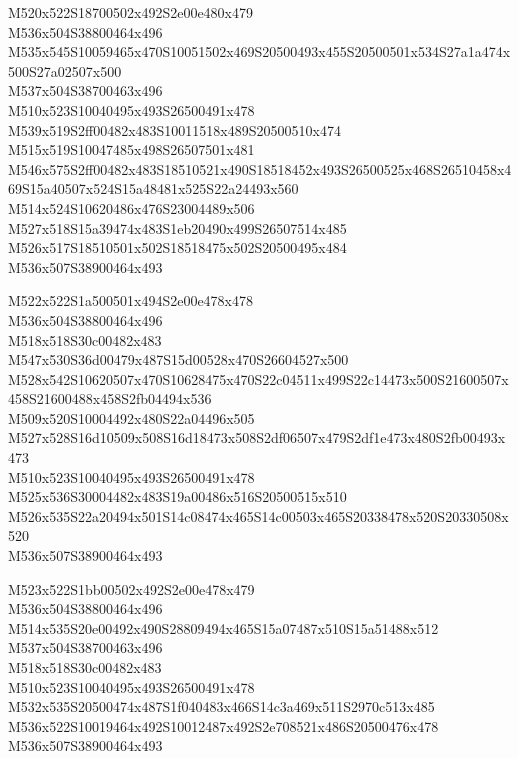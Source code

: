 \documentclass{article}
\begin{document}
\begin{multicols}{5}
\begin{center}

M520x522S18700502x492S2e00e480x479 %
\\M536x504S38800464x496 %
\\M535x545S10059465x470S10051502x469S20500493x455S20500501x534S27a1a474x500S27a02507x500 %
\\M537x504S38700463x496 %
\\M510x523S10040495x493S26500491x478 %
\\M539x519S2ff00482x483S10011518x489S20500510x474 %
\\M515x519S10047485x498S26507501x481 %
\\M546x575S2ff00482x483S18510521x490S18518452x493S26500525x468S26510458x469S15a40507x524S15a48481x525S22a24493x560 %
\\M514x524S10620486x476S23004489x506 %
\\M527x518S15a39474x483S1eb20490x499S26507514x485 %
\\M526x517S18510501x502S18518475x502S20500495x484 %
\\M536x507S38900464x493 %
\vfil
\columnbreak

M522x522S1a500501x494S2e00e478x478 %
\\M536x504S38800464x496 %
\\M518x518S30c00482x483 %
\\M547x530S36d00479x487S15d00528x470S26604527x500 %
\\M528x542S10620507x470S10628475x470S22c04511x499S22c14473x500S21600507x458S21600488x458S2fb04494x536 %
\\M509x520S10004492x480S22a04496x505 %
\\M527x528S16d10509x508S16d18473x508S2df06507x479S2df1e473x480S2fb00493x473 %
\\M510x523S10040495x493S26500491x478 %
\\M525x536S30004482x483S19a00486x516S20500515x510 %
\\M526x535S22a20494x501S14c08474x465S14c00503x465S20338478x520S20330508x520 %
\\M536x507S38900464x493 %
\vfil
\columnbreak

M523x522S1bb00502x492S2e00e478x479 %
\\M536x504S38800464x496 %
\\M514x535S20e00492x490S28809494x465S15a07487x510S15a51488x512 %
\\M537x504S38700463x496 %
\\M518x518S30c00482x483 %
\\M510x523S10040495x493S26500491x478 %
\\M532x535S20500474x487S1f040483x466S14c3a469x511S2970c513x485 %
\\M536x522S10019464x492S10012487x492S2e708521x486S20500476x478 %
\\M536x507S38900464x493 %
\vfil
\columnbreak


\end{center}
\end{multicols}
\end{document}
